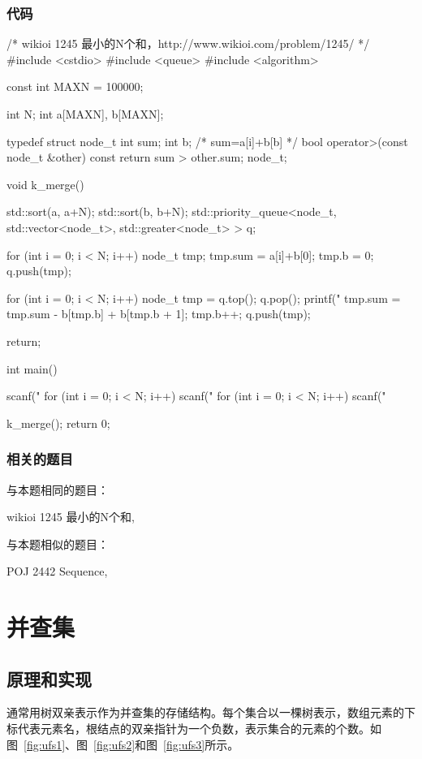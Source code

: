 \subsubsection{代码}
\begin{Codex}[label=sequence.cpp]
/* wikioi 1245 最小的N个和，http://www.wikioi.com/problem/1245/  */
#include <cstdio>
#include <queue>
#include <algorithm>

const int MAXN = 100000;

int N;
int a[MAXN], b[MAXN];

typedef struct node_t {
    int sum;
    int b; /* sum=a[i]+b[b] */
    bool operator>(const node_t &other) const {
        return sum > other.sum;
    }
} node_t;


void k_merge() {
    std::sort(a, a+N);
    std::sort(b, b+N);
    std::priority_queue<node_t, std::vector<node_t>,
                                std::greater<node_t> > q;

    for (int i = 0; i < N; i++) {
        node_t tmp;
        tmp.sum = a[i]+b[0];
        tmp.b = 0;
        q.push(tmp);
    }

    for (int i = 0; i < N; i++) {
        node_t tmp = q.top(); q.pop();
        printf("%
        tmp.sum = tmp.sum - b[tmp.b] + b[tmp.b + 1];
        tmp.b++;
        q.push(tmp);
    }

    return;
}

int main() {
    scanf("%
    for (int i = 0; i < N; i++) {
        scanf("%
    }
    for (int i = 0; i < N; i++) {
        scanf("%
    }

    k_merge();
    return 0;
}
\end{Codex}

\subsubsection{相关的题目}
与本题相同的题目：
\begindot
\item wikioi 1245 最小的N个和, 
\myenddot

与本题相似的题目：
\begindot
\item  POJ 2442 Sequence, 
\myenddot


\section{并查集} %

\subsection{原理和实现}
通常用树双亲表示作为并查集的存储结构。每个集合以一棵树表示，数组元素的下标代表元素名，根结点的双亲指针为一个负数，表示集合的元素的个数。如图~\ref{fig:ufs1}、图~\ref{fig:ufs2}和图~\ref{fig:ufs3}所示。

